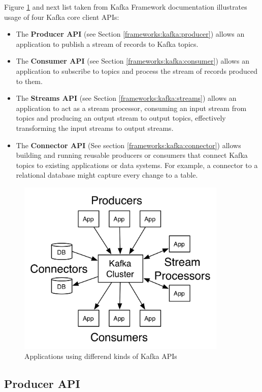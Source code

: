 Figure \ref{frameworks:kafka:api} and next list taken from Kafka Framework documentation \citep{Kafka}
illustrates usage of four Kafka core client APIs:
\begin{itemize}
  \item The \textbf{Producer API} (see Section \ref{frameworks:kafka:producer}) allows an application to publish
    a stream of records to Kafka topics.
  \item The \textbf{Consumer API} (see Section \ref{frameworks:kafka:consumer}) allows an application to subscribe
    to topics and process the stream of records produced to them.
  \item The \textbf{Streams API} (see Section \ref{frameworks:kafka:streams}) allows an application to act as a stream processor,
    consuming an input stream from topics and producing an output stream to output topics,
    effectively transforming the input streams to output streams.
  \item The \textbf{Connector API} (See section \ref{frameworks:kafka:connector}) allows building and running reusable producers or consumers
    that connect Kafka topics to existing applications or data systems.
    For example, a connector to a relational database might capture every change to a table. 
\end{itemize}

\begin{figure}[h]
  \center
  \includegraphics[width=100mm]{img/kafka-apis.png}
  \caption{Applications using differend kinds of Kafka APIs}
  \label{frameworks:kafka:api}
\end{figure}




\subsection{Producer API \label{frameworks:kafka:producer}}

